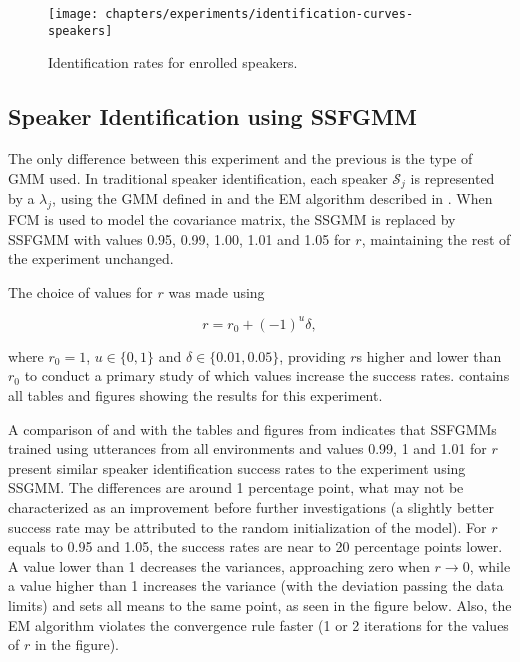 \begin{figure}[ht]
    \centering
    \texttt{[image: chapters/experiments/identification-curves-speakers]}
    \caption{Identification rates for enrolled speakers.}
    \label{fig:identification-curves-speakers}
\end{figure}

\subsection{Speaker Identification using SSFGMM}

The only difference between this experiment and the previous is the type of GMM used. In traditional speaker identification, each speaker $\mathcal{S}_j$ is represented by a $\lambda_j$, using the GMM defined in  and the EM algorithm described in . When FCM is used to model the covariance matrix, the SSGMM is replaced by SSFGMM with values 0.95, 0.99, 1.00, 1.01 and 1.05 for $r$, maintaining the rest of the experiment unchanged.

The choice of values for $r$ was made using

\begin{equation}
    r = r_0 + (-1)^u\delta,
    \label{eq:choice-of-r}
\end{equation}

\noindent where $r_0 = 1$, $u \in \{0, 1\}$ and $\delta \in \{0.01, 0.05\}$, providing $r$s higher and lower than $r_0$ to conduct a primary study of which values increase the success rates.  contains all tables and figures showing the results for this experiment.

A comparison of  and  with the tables and figures from  indicates that SSFGMMs trained using utterances from all environments and values 0.99, 1 and 1.01 for $r$ present similar speaker identification success rates to the experiment using SSGMM. The differences are around 1 percentage point, what may not be characterized as an improvement before further investigations (a slightly better success rate may be attributed to the random initialization of the model). For $r$ equals to 0.95 and 1.05, the success rates are near to 20 percentage points lower. A value lower than 1 decreases the variances, approaching zero when $r \to 0$, while a value higher than 1 increases the variance (with the deviation passing the data limits) and sets all means to the same point, as seen in the figure below. Also, the EM algorithm violates the convergence rule faster (1 or 2 iterations for the values of $r$ in the figure).

